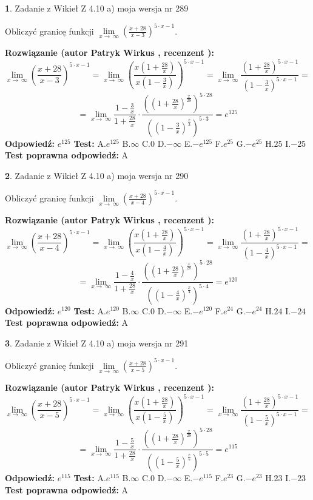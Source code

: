 \documentclass[12pt, a4paper]{article}
\theoremstyle{definition} %
\newtheorem{zad}{}
\newcommand{\zadStart}[1]{\begin{zad}#1\newline}
\newcommand{\zadStop}{\end{zad}}
\newcommand{\rozwStart}[2]{\noindent \textbf{Rozwiązanie (autor #1 , recenzent #2): }\newline}
\newcommand{\rozwStop}{\newline}
\newcommand{\odpStart}{\noindent \textbf{Odpowiedź:}\newline}
\newcommand{\odpStop}{\newline}
\newcommand{\testStart}{\noindent \textbf{Test:}\newline}
\newcommand{\testStop}{\newline}
\newcommand{\kluczStart}{\noindent \textbf{Test poprawna odpowiedź:}\newline}
\newcommand{\kluczStop}{\newline}
\begin{document}
\zadStart{Zadanie z Wikieł Z 4.10 a) moja wersja nr 289}

Obliczyć granicę funkcji  $\lim\limits_{x\to\ \infty}(\frac{x+28}{x-3})^{5\cdot x-1}$.
\zadStop
\rozwStart{Patryk Wirkus}{}
$$\lim\limits_{x\to\ \infty}(\frac{x+28}{x-3})^{5\cdot x-1} = \lim\limits_{x\to\ \infty}(\frac{x(1+\frac{28}{x})}{x(1-\frac{3}{x})})^{5\cdot x-1}=\lim\limits_{x\to\ \infty}\frac{(1+\frac{28}{x})^{5\cdot x-1}}{(1-\frac{3}{x})^{5\cdot x-1}}=$$
$$=\lim\limits_{x\to\ \infty}\frac{1-\frac{3}{x}}{1+\frac{28}{x}}\cdot\frac{((1+\frac{28}{x})^{\frac{x}{28}})^{5\cdot28}}{((1-\frac{3}{x})^{\frac{x}{3}})^{5\cdot3}}=e^{125}$$
\rozwStop
\odpStart
$e^{125}$
\odpStop
\testStart
A.$e^{125}$ B.$\infty$ C.$0$ D.$-\infty$ E.$-e^{125}$
F.$e^{25}$ G.$-e^{25}$
H.$25$
I.$-25$
\testStop
\kluczStart
A
\kluczStop



\zadStart{Zadanie z Wikieł Z 4.10 a) moja wersja nr 290}

Obliczyć granicę funkcji  $\lim\limits_{x\to\ \infty}(\frac{x+28}{x-4})^{5\cdot x-1}$.
\zadStop
\rozwStart{Patryk Wirkus}{}
$$\lim\limits_{x\to\ \infty}(\frac{x+28}{x-4})^{5\cdot x-1} = \lim\limits_{x\to\ \infty}(\frac{x(1+\frac{28}{x})}{x(1-\frac{4}{x})})^{5\cdot x-1}=\lim\limits_{x\to\ \infty}\frac{(1+\frac{28}{x})^{5\cdot x-1}}{(1-\frac{4}{x})^{5\cdot x-1}}=$$
$$=\lim\limits_{x\to\ \infty}\frac{1-\frac{4}{x}}{1+\frac{28}{x}}\cdot\frac{((1+\frac{28}{x})^{\frac{x}{28}})^{5\cdot28}}{((1-\frac{4}{x})^{\frac{x}{4}})^{5\cdot4}}=e^{120}$$
\rozwStop
\odpStart
$e^{120}$
\odpStop
\testStart
A.$e^{120}$ B.$\infty$ C.$0$ D.$-\infty$ E.$-e^{120}$
F.$e^{24}$ G.$-e^{24}$
H.$24$
I.$-24$
\testStop
\kluczStart
A
\kluczStop



\zadStart{Zadanie z Wikieł Z 4.10 a) moja wersja nr 291}

Obliczyć granicę funkcji  $\lim\limits_{x\to\ \infty}(\frac{x+28}{x-5})^{5\cdot x-1}$.
\zadStop
\rozwStart{Patryk Wirkus}{}
$$\lim\limits_{x\to\ \infty}(\frac{x+28}{x-5})^{5\cdot x-1} = \lim\limits_{x\to\ \infty}(\frac{x(1+\frac{28}{x})}{x(1-\frac{5}{x})})^{5\cdot x-1}=\lim\limits_{x\to\ \infty}\frac{(1+\frac{28}{x})^{5\cdot x-1}}{(1-\frac{5}{x})^{5\cdot x-1}}=$$
$$=\lim\limits_{x\to\ \infty}\frac{1-\frac{5}{x}}{1+\frac{28}{x}}\cdot\frac{((1+\frac{28}{x})^{\frac{x}{28}})^{5\cdot28}}{((1-\frac{5}{x})^{\frac{x}{5}})^{5\cdot5}}=e^{115}$$
\rozwStop
\odpStart
$e^{115}$
\odpStop
\testStart
A.$e^{115}$ B.$\infty$ C.$0$ D.$-\infty$ E.$-e^{115}$
F.$e^{23}$ G.$-e^{23}$
H.$23$
I.$-23$
\testStop
\kluczStart
A
\kluczStop
\end{document}
